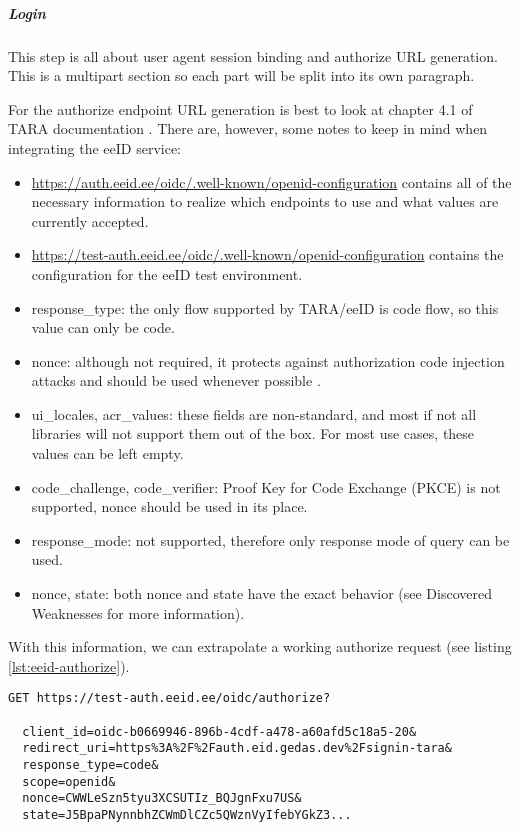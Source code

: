 \subparagraph{Login}

This step is all about user agent session binding and {authorize URL} generation. This is a multipart section so each part will be split into its own paragraph.

For the {authorize} endpoint URL generation is best to look at chapter 4.1 of TARA documentation \cite{tara-technical}. There are, however, some notes to keep in mind when integrating the eeID service:

\begin{itemize}
  \item \url{https://auth.eeid.ee/oidc/.well-known/openid-configuration} contains all of the necessary information to realize which endpoints to use and what values are currently accepted.
  \item \url{https://test-auth.eeid.ee/oidc/.well-known/openid-configuration} contains the configuration for the eeID test environment.
  \item {response\_type}: the only flow supported by TARA/eeID is code flow, so this value can only be code.
  \item {nonce}: although not required, it protects against authorization code injection attacks and should be used whenever possible \cite{ietf-oauth-security-topics-19}.
  \item {ui\_locales, acr\_values}: these fields are non-standard, and most if not all libraries will not support them out of the box. For most use cases, these values can be left empty.
  \item {code\_challenge, code\_verifier}: Proof Key for Code Exchange (PKCE) is not supported, {nonce} should be used in its place.
  \item {response\_mode}: not supported, therefore only response mode of {query} can be used.
  \item {nonce, state}: both nonce and state have the exact behavior (see Discovered Weaknesses for more information).
\end{itemize}

With this information, we can extrapolate a working {authorize} request (see listing \ref{lst:eeid-authorize}).

\begin{lstlisting}[caption={The eeID service authorize endpoint request}, label={lst:eeid-authorize}]
  GET https://test-auth.eeid.ee/oidc/authorize?

  client_id=oidc-b0669946-896b-4cdf-a478-a60afd5c18a5-20&
  redirect_uri=https%3A%2F%2Fauth.eid.gedas.dev%2Fsignin-tara&
  response_type=code&
  scope=openid&
  nonce=CWWLeSzn5tyu3XCSUTIz_BQJgnFxu7US&
  state=J5BpaPNynnbhZCWmDlCZc5QWznVyIfebYGkZ3...
\end{lstlisting}

